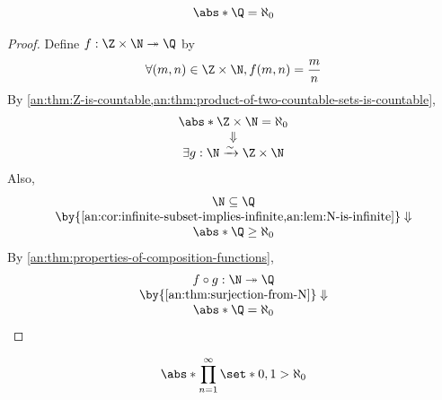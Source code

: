 \bigskip

\begin{theorem} \label{an:thm:Q-is-countable}
  \[
    \abs*{\Q} = \aleph_{0}
  \]
\end{theorem}

\begin{proof}
  Define $f: \Z \times \N \twoheadrightarrow \Q$ by
  \[
    \forall (m, n) \in \Z \times \N, f(m, n) = \frac{m}{n}
  \]
  By \cref{an:thm:Z-is-countable,an:thm:product-of-two-countable-sets-is-countable},
  \[
    \begin{array}{c}
      \abs*{\Z \times \N} = \aleph_{0} \\
      \Downarrow                       \\
      \exists g: \N \xrightarrow{\sim} \Z \times \N
    \end{array}
  \]
  Also,
  \[
    \begin{array}{c}
      \N \subseteq \Q                                                                     \\
      \by{\Cref{an:cor:infinite-subset-implies-infinite,an:lem:N-is-infinite}} \Downarrow \\
      \abs*{\Q} \geq \aleph_{0}
    \end{array}
  \]
  By \cref{an:thm:properties-of-composition-functions},
  \[
    \begin{array}{c}
      f \circ g: \N \twoheadrightarrow \Q             \\
      \by{\Cref{an:thm:surjection-from-N}} \Downarrow \\
      \abs*{\Q} = \aleph_{0}
    \end{array}
  \]
\end{proof}

\bigskip

\begin{lemma} \label{an:lem:infinite-product-of-finite-sets-is-uncountable}
  \[
    \abs*{\prod_{n = 1}^{\infty} \set*{0, 1}} > \aleph_{0}
  \]
\end{lemma}

